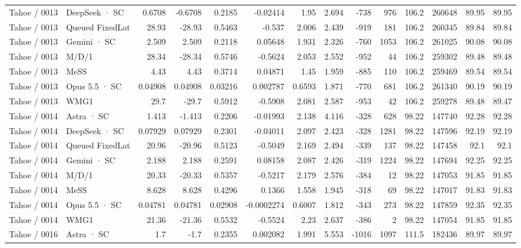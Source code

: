 \begin{tabular}{llrrrrrrrrrrrr}
Tahoe / 0013 & DeepSeek · SC & 0.6708 & -0.6708 & 0.2185 & -0.02414 & 1.95 & 2.694 & -738 & 976 & 106.2 & 260648 & 89.95 & 89.95 \\
Tahoe / 0013 & Queued FixedLat & 28.93 & -28.93 & 0.5463 & -0.537 & 2.006 & 2.439 & -919 & 181 & 106.2 & 260345 & 89.84 & 89.84 \\
Tahoe / 0013 & Gemini · SC & 2.509 & 2.509 & 0.2118 & 0.05648 & 1.931 & 2.326 & -760 & 1053 & 106.2 & 261025 & 90.08 & 90.08 \\
Tahoe / 0013 & M/D/1 & 28.34 & -28.34 & 0.5746 & -0.5624 & 2.053 & 2.552 & -952 & 44 & 106.2 & 259302 & 89.48 & 89.48 \\
Tahoe / 0013 & MeSS & 4.43 & 4.43 & 0.3714 & 0.04871 & 1.45 & 1.959 & -885 & 110 & 106.2 & 259469 & 89.54 & 89.54 \\
Tahoe / 0013 & Opus 5.5 · SC & 0.04908 & 0.04908 & 0.03216 & 0.002787 & 0.6593 & 1.871 & -770 & 681 & 106.2 & 261340 & 90.19 & 90.19 \\
Tahoe / 0013 & WMG1 & 29.7 & -29.7 & 0.5912 & -0.5908 & 2.081 & 2.587 & -953 & 42 & 106.2 & 259278 & 89.48 & 89.47 \\
Tahoe / 0014 & Astra · SC & 1.413 & -1.413 & 0.2206 & -0.01993 & 2.138 & 4.116 & -328 & 628 & 98.22 & 147740 & 92.28 & 92.28 \\
Tahoe / 0014 & DeepSeek · SC & 0.07929 & 0.07929 & 0.2301 & -0.04011 & 2.097 & 2.423 & -328 & 1281 & 98.22 & 147596 & 92.19 & 92.19 \\
Tahoe / 0014 & Queued FixedLat & 20.96 & -20.96 & 0.5123 & -0.5049 & 2.169 & 2.494 & -339 & 137 & 98.22 & 147458 & 92.1 & 92.1 \\
Tahoe / 0014 & Gemini · SC & 2.188 & 2.188 & 0.2591 & 0.08158 & 2.087 & 2.426 & -319 & 1224 & 98.22 & 147694 & 92.25 & 92.25 \\
Tahoe / 0014 & M/D/1 & 20.33 & -20.33 & 0.5357 & -0.5217 & 2.179 & 2.576 & -384 & 12 & 98.22 & 147053 & 91.85 & 91.85 \\
Tahoe / 0014 & MeSS & 8.628 & 8.628 & 0.4296 & 0.1366 & 1.558 & 1.945 & -318 & 69 & 98.22 & 147017 & 91.83 & 91.83 \\
Tahoe / 0014 & Opus 5.5 · SC & 0.04781 & 0.04781 & 0.02908 & -0.0002274 & 0.6007 & 1.812 & -343 & 273 & 98.22 & 147859 & 92.35 & 92.35 \\
Tahoe / 0014 & WMG1 & 21.36 & -21.36 & 0.5532 & -0.5524 & 2.23 & 2.637 & -386 & 2 & 98.22 & 147054 & 91.85 & 91.85 \\
Tahoe / 0016 & Astra · SC & 1.7 & -1.7 & 0.2355 & 0.002082 & 1.991 & 5.553 & -1016 & 1097 & 111.5 & 182436 & 89.97 & 89.97 \\

\end{tabular}
